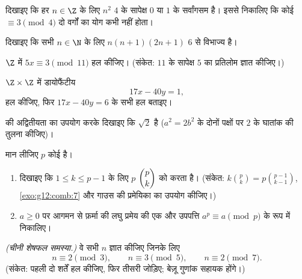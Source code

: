\begin{exercise}[$\star$]\label{exo:g12:arith:4}
दिखाइए कि हर $n \in \Z$ के लिए $n^2$ $4$ के सापेक्ष $0$ या $1$ के सर्वांगसम
है। इससे निकालिए कि कोई  $\equiv 3 \pmod 4$ दो वर्गों का योग कभी नहीं होता।
\end{exercise}

\begin{exercise}[$\star\star$]\label{exo:g12:arith:5}
दिखाइए कि सभी $n \in \N$ के लिए $n(n+1)(2n+1)$ $6$ से विभाज्य है।
\end{exercise}

\begin{exercise}[$\star\star$]\label{exo:g12:arith:6}
$\Z$ में  $5x \equiv 3 \pmod{11}$ हल कीजिए। (संकेत: $11$ के सापेक्ष $5$ का
प्रतिलोम ज्ञात कीजिए।)
\end{exercise}

\begin{exercise}[$\star\star$]\label{exo:g12:arith:7}
$\Z \times \Z$ में डायोफैंटीय 
\[
17x - 40y = 1,
\]
हल कीजिए, फिर $17x - 40y = 6$ के सभी हल बताइए।
\end{exercise}

\begin{exercise}[$\star\star$]\label{exo:g12:arith:8}
  की अद्वितीयता का उपयोग करके दिखाइए कि $\sqrt2$  है ($a^2 = 2b^2$
के दोनों पक्षों पर $2$ के घातांक की तुलना कीजिए)।
\end{exercise}

\begin{exercise}[$\star\star\star$]\label{exo:g12:arith:9}
मान लीजिए $p$ कोई  है।
\begin{enumerate}
  \item दिखाइए कि $1 \leq k \leq p - 1$ के लिए $p$ $\dbinom{p}{k}$ को  करता है। (संकेत:
        $k\binom pk = p\binom{p-1}{k-1}$, \cref{exo:g12:comb:7} और गाउस की प्रमेयिका का उपयोग कीजिए।)
  \item $a \geq 0$ पर आगमन से फ़र्मा की लघु प्रमेय की एक और उपपत्ति $a^p \equiv a \pmod p$ के रूप
        में निकालिए।
\end{enumerate}
\end{exercise}

\begin{exercise}[$\star\star\star$]\label{exo:g12:arith:10}
\emph{(चीनी शेषफल समस्या.)} वे सभी  $n$ ज्ञात कीजिए जिनके लिए
\[
n \equiv 2 \pmod 3, \qquad n \equiv 3 \pmod 5, \qquad n \equiv 2 \pmod 7 .
\]
(संकेत: पहली दो शर्तें हल कीजिए, फिर तीसरी जोड़िए; बेज़ू गुणांक सहायक होंगे।)
\end{exercise}

